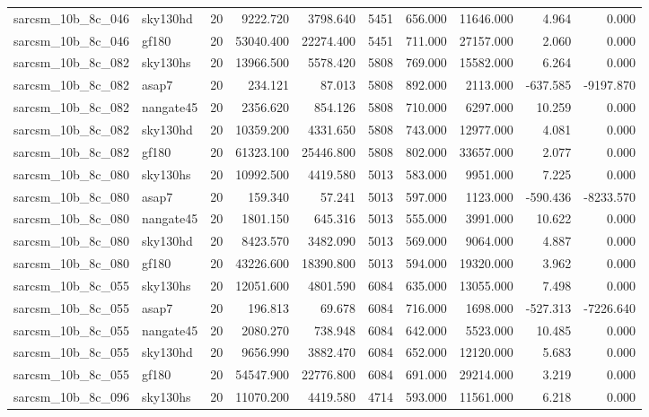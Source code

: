\begin{tabular}{llrrrrrrrr}
sarcsm\_10b\_8c\_046 & sky130hd & 20 & 9222.720 & 3798.640 & 5451 & 656.000 & 11646.000 & 4.964 & 0.000 \\
sarcsm\_10b\_8c\_046 & gf180 & 20 & 53040.400 & 22274.400 & 5451 & 711.000 & 27157.000 & 2.060 & 0.000 \\
sarcsm\_10b\_8c\_082 & sky130hs & 20 & 13966.500 & 5578.420 & 5808 & 769.000 & 15582.000 & 6.264 & 0.000 \\
sarcsm\_10b\_8c\_082 & asap7 & 20 & 234.121 & 87.013 & 5808 & 892.000 & 2113.000 & -637.585 & -9197.870 \\
sarcsm\_10b\_8c\_082 & nangate45 & 20 & 2356.620 & 854.126 & 5808 & 710.000 & 6297.000 & 10.259 & 0.000 \\
sarcsm\_10b\_8c\_082 & sky130hd & 20 & 10359.200 & 4331.650 & 5808 & 743.000 & 12977.000 & 4.081 & 0.000 \\
sarcsm\_10b\_8c\_082 & gf180 & 20 & 61323.100 & 25446.800 & 5808 & 802.000 & 33657.000 & 2.077 & 0.000 \\
sarcsm\_10b\_8c\_080 & sky130hs & 20 & 10992.500 & 4419.580 & 5013 & 583.000 & 9951.000 & 7.225 & 0.000 \\
sarcsm\_10b\_8c\_080 & asap7 & 20 & 159.340 & 57.241 & 5013 & 597.000 & 1123.000 & -590.436 & -8233.570 \\
sarcsm\_10b\_8c\_080 & nangate45 & 20 & 1801.150 & 645.316 & 5013 & 555.000 & 3991.000 & 10.622 & 0.000 \\
sarcsm\_10b\_8c\_080 & sky130hd & 20 & 8423.570 & 3482.090 & 5013 & 569.000 & 9064.000 & 4.887 & 0.000 \\
sarcsm\_10b\_8c\_080 & gf180 & 20 & 43226.600 & 18390.800 & 5013 & 594.000 & 19320.000 & 3.962 & 0.000 \\
sarcsm\_10b\_8c\_055 & sky130hs & 20 & 12051.600 & 4801.590 & 6084 & 635.000 & 13055.000 & 7.498 & 0.000 \\
sarcsm\_10b\_8c\_055 & asap7 & 20 & 196.813 & 69.678 & 6084 & 716.000 & 1698.000 & -527.313 & -7226.640 \\
sarcsm\_10b\_8c\_055 & nangate45 & 20 & 2080.270 & 738.948 & 6084 & 642.000 & 5523.000 & 10.485 & 0.000 \\
sarcsm\_10b\_8c\_055 & sky130hd & 20 & 9656.990 & 3882.470 & 6084 & 652.000 & 12120.000 & 5.683 & 0.000 \\
sarcsm\_10b\_8c\_055 & gf180 & 20 & 54547.900 & 22776.800 & 6084 & 691.000 & 29214.000 & 3.219 & 0.000 \\
sarcsm\_10b\_8c\_096 & sky130hs & 20 & 11070.200 & 4419.580 & 4714 & 593.000 & 11561.000 & 6.218 & 0.000 \\

\end{tabular}
